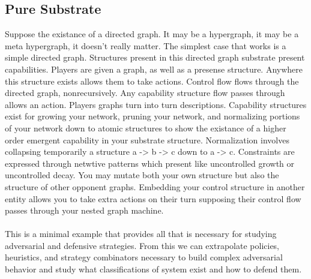 \documentclass{article}
\begin{document}
	\subsection{Pure Substrate}
	Suppose the existance of a directed graph. It may be a hypergraph, it may be a meta hypergraph, it doesn't really matter. The simplest case that works is a simple directed graph. Structures present in this directed graph substrate present capabilities. Players are given a graph, as well as a presense structure. Anywhere this structure exists allows them to take actions. Control flow flows through the directed graph, nonrecursively. Any capability structure flow passes through allows an action. Players graphs turn into turn descriptions. Capability structures exist for growing your network, pruning your network, and normalizing portions of your network down to atomic structures to show the existance of a higher order emergent capability in your substrate structure. Normalization involves collapsing temporarily a structure a -> b -> c down to a -> c. Constraints are expressed through netwtive patterns which present like uncontrolled growth or uncontrolled decay. You may mutate both your own structure but also the structure of other opponent graphs. Embedding your control structure in another entity allows you to take extra actions on their turn supposing their control flow passes through your nested graph machine. \\\\
	This is a minimal example that provides all that is necessary for studying adversarial and defensive strategies. From this we can extrapolate policies, heuristics, and strategy combinators necessary to build complex adversarial behavior and study what classifications of system exist and how to defend them. 
\end{document}
